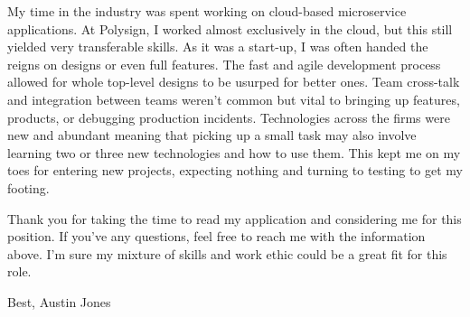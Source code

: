 \documentclass[a4paper,12pt]{article}
\begin{document}
My time in the industry was spent working on cloud-based microservice applications.
At Polysign, I worked almost exclusively in the cloud, but this still yielded very transferable skills.
As it was a start-up, I was often handed the reigns on designs or even full features.
The fast and agile development process allowed for whole top-level designs to be usurped for better ones.
Team cross-talk and integration between teams weren't common but vital to bringing up features, products, or debugging production incidents.
Technologies across the firms were new and abundant meaning that picking up a small task may also involve learning two or three new technologies and how to use them.
This kept me on my toes for entering new projects, expecting nothing and turning to testing to get my footing.

Thank you for taking the time to read my application and considering me for this position.
If you've any questions, feel free to reach me with the information above.
I'm sure my mixture of skills and work ethic could be a great fit for this role.


Best,
Austin Jones
\end{document}
